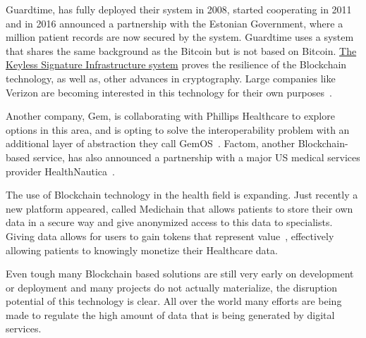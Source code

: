 Guardtime, has fully deployed their system in 2008, started cooperating in 2011
and in 2016 announced a partnership with the Estonian Government, where a
million patient records are now secured by the system. Guardtime uses a system
that shares the same background as the Bitcoin but is not based on Bitcoin.
\href{https://guardtime.com/technology}{The Keyless Signature Infrastructure
system} proves the resilience of the Blockchain technology, as well as, other
advances in cryptography. Large companies like Verizon are becoming interested
in this technology for their own
purposes~\cite{GuardTime2018,EstonianGovernmentGuardTime2016}.

Another company, Gem, is collaborating with Phillips Healthcare to explore
options in this area\cite{philips2016}, and is opting to solve the
interoperability problem with an additional layer of abstraction they call
GemOS~\cite{gemOS2018}. Factom, another Blockchain-based service, has also
announced a partnership with a major US medical services provider
HealthNautica~\cite{BlockchainCompHealth2017,FactomPartnership2017}.

The use of Blockchain technology in the health field is expanding. Just
recently a new platform appeared, called Medichain that allows patients to
store their own data in a secure way and give anonymized access to this data to
specialists. Giving data allows for users to gain tokens that represent
value~\cite{MediChain2018}, effectively allowing patients to knowingly monetize
their Healthcare data.

Even tough many Blockchain based solutions are still very early on development
or deployment and many projects do not actually materialize, the disruption
potential of this technology is clear. All over the world many efforts are
being made to regulate the high amount of data that is being generated by
digital services.

